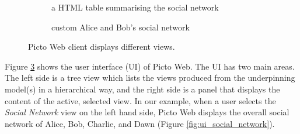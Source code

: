 \documentclass[sigconf,review]{acmart}
\begin{document}
\begin{figure}[h]
\begin{subfigure}{0.49\textwidth}
    \caption{a HTML table summarising the social network}
    \label{fig:ui_tabular}
  \end{subfigure}
  \hfill
  \begin{subfigure}{0.49\textwidth}
    \caption{custom Alice and Bob's social network}
    \label{fig:ui_custom}
  \end{subfigure}
  \hfill
  \caption{Picto Web client displays different views.}
  \label{fig:ui}
\end{figure}

Figure \ref{fig:ui} shows the user interface (UI) of Picto Web. The UI has two main areas. The left side is a tree view which lists the views produced from the underpinning model(s) in a hierarchical way, and the right side is a panel that displays the content of the active, selected view. In our example, when a user selects the \emph{Social Network} view on the left hand side, Picto Web displays the overall social network of Alice, Bob, Charlie, and Dawn (Figure \ref{fig:ui_social_network}). 
\end{document}
